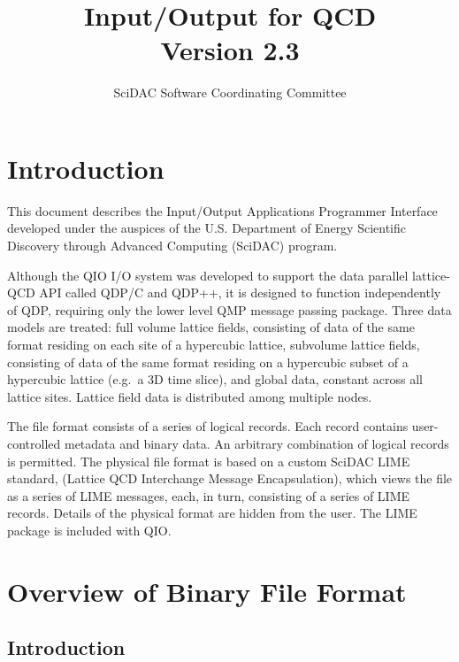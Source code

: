 \documentclass{article}
\begin{document}
\title{
   Input/Output for QCD \\{\large Version 2.3}
}
\author{ SciDAC Software Coordinating Committee}

\maketitle
\section{Introduction}
This document describes the Input/Output Applications Programmer
Interface developed under the auspices of the U.S. Department of
Energy Scientific Discovery through Advanced Computing (SciDAC)
program.

Although the QIO I/O system was developed to support the data parallel
lattice-QCD API called QDP/C and QDP++, it is designed to function
independently of QDP, requiring only the lower level QMP message
passing package.  Three data models are treated: full volume lattice
fields, consisting of data of the same format residing on each site of
a hypercubic lattice, subvolume lattice fields, consisting of data of
the same format residing on a hypercubic subset of a hypercubic
lattice (e.g.\ a 3D time slice), and global data, constant across all
lattice sites.  Lattice field data is distributed among multiple
nodes.

The file format consists of a series of logical records.  Each record
contains user-controlled metadata and binary data.  An arbitrary
combination of logical records is permitted.  The physical file format
is based on a custom SciDAC LIME standard, (Lattice QCD Interchange
Message Encapsulation), which views the file as a series of LIME
messages, each, in turn, consisting of a series of LIME records.
Details of the physical format are hidden from the user.  The LIME
package is included with QIO.

\section{Overview of Binary File Format}
\label{sec.fileformat}

\subsection{Introduction}
\end{document}
